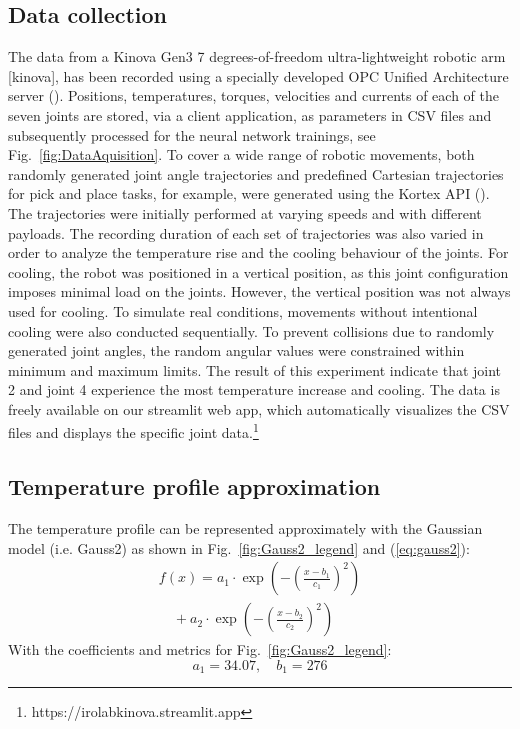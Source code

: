 \documentclass{ifacconf}
\begin{document}
\subsection{Data collection}
The data from a Kinova Gen3 7 degrees-of-freedom ultra-lightweight robotic arm [kinova], has been recorded using a specially developed OPC Unified Architecture server (\cite{Girke}). 
Positions, temperatures, torques, velocities and currents of each of the seven joints are stored, via a client application, as parameters in CSV files and subsequently processed for the neural network trainings, see Fig.~\ref{fig:DataAquisition}.
To cover a wide range of robotic movements, both randomly generated joint angle trajectories and predefined Cartesian trajectories for pick and place tasks, for example, were generated using the Kortex API (\cite{kortexAPI}). 
The trajectories were initially performed at varying speeds and with different payloads. The recording duration of each set of trajectories was also varied in order to analyze the temperature rise and the cooling behaviour of the joints. 
For cooling, the robot was positioned in a vertical position, as this joint configuration imposes minimal load on the joints. However, the vertical position was not always used for cooling. To simulate real conditions, movements without intentional cooling were also conducted sequentially.
To prevent collisions due to randomly generated joint angles, the random angular values were constrained within minimum and maximum limits. 
The result of this experiment indicate that joint 2 and joint 4 experience the most temperature increase and cooling. The data is freely available on our streamlit web app, 
which automatically visualizes the CSV files and displays the specific joint data.\footnote{https://irolabkinova.streamlit.app}  

\subsection{Temperature profile approximation}
The temperature profile can be represented approximately with the Gaussian model (i.e. Gauss2) as shown in Fig.~\ref{fig:Gauss2_legend} and (\ref{eq:gauss2}):
\begin{equation} \label{eq:gauss2}
  \begin{array}{l}
  f(x) = a_1 \cdot \exp\left( -\left( \frac{x - b_1}{c_1} \right)^2 \right) \\
  \quad + a_2 \cdot \exp\left( -\left( \frac{x - b_2}{c_2} \right)^2 \right)
  \end{array}
  \end{equation}
With the coefficients and metrics for Fig.~\ref{fig:Gauss2_legend}:
\[
a_1 = 34.07, \quad b_1 = 276 
\]
\end{document}
